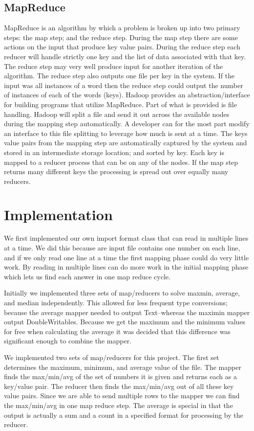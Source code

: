 \documentclass[11pt]{article}
\begin{document}
\subsection*{MapReduce}
MapReduce is an algorithm by which a problem is broken up into two primary steps: the map step; and the reduce step.  During the map step there are some actions on the input that produce key value pairs.  During the reduce step each reducer will handle strictly one key and the list of data associated with that key.  The reduce step may very well produce input for another iteration of the algorithm.  The reduce step also outputs one file per key in the system.  If the input was all instances of a word then the reduce step could output the number of instances of each of the words (keys).  Hadoop provides an abstraction/interface for building programs that utilize MapReduce.  Part of what is provided is file handling.  Hadoop will split a file and send it out across the available nodes during the mapping step automatically.  A developer can for the most part modify an interface to this file splitting to leverage how much is sent at a time.  The keys value pairs from the mapping step are automatically captured by the system and stored in an intermediate storage location; and sorted by key.  Each key is mapped to a reducer process that can be on any of the nodes.  If the map step returns many different keys the processing is spread out over equally many reducers.

\section{Implementation}
We first implemented our own import format class that can read in multiple lines at a time.  We did this because are input file contains one number on each line, and if we only read one line at a time the first mapping phase could do very little work.  By reading in multiple lines can do more work in the initial mapping phase which lets us find each answer in one map reduce cycle.

Initially we implemented three sets of map/reducers to solve maxmin, average, and median independently.  This allowed for less frequent type conversions; because the  average mapper needed to output Text--whereas the maximin mapper output DoubleWritables.  Because we get the maximum and the minimum values for free when calculating the average it was decided that this difference was significant enough to combine the mapper.

We implemented two sets of map/reducers for this project.  The first set determines the maximum, minimum,  and average value of the file.  The mapper finds the max/min/avg of the set of numbers it is given and returns each as a key/value pair.  The reducer then finds the max/min/avg out of all these key value pairs.  Since we are able to send multiple rows to the mapper we can find the max/min/avg in one map reduce step.  The average is special in that the output is actually a sum and a count in a specified format for processing by the reducer.
\end{document}
